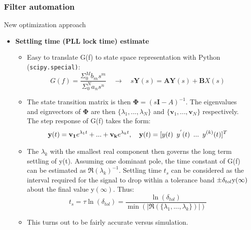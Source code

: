 \documentclass[t, screen, aspectratio=43]{beamer}
\begin{document}
\begin{frame}
	\frametitle{Filter automation}
	\begin{block}{New optimization approach}
		\begin{itemize}
			\scriptsize
			\item \textbf{Settling time (PLL lock time) estimate}
			\begin{itemize}
				\tiny
				\item Easy to translate G(f) to state space representation with Python (\texttt{scipy.special)}:
				\tiny
				\begin{equation}
				G(f) = \frac{\Sigma_0^M b_ms^m}{\Sigma_0^N a_ns^n} \hspace{1em} \rightarrow \hspace{1em} s\mathbf{Y}(s) = \mathbf{AY}(s) +\mathbf{B}X(s)
				\end{equation}
				\item The state transition matrix is then $\boldsymbol{\Phi} = (s\mathbf{I}-A)^{-1}$. The eigenvalues and eignvectors of $\boldsymbol{\Phi}$ are then $\{\lambda_1, ... , \lambda_{N}\}$ and $\{\mathbf{v}_1, ... , \mathbf{v}_N\}$ respectively. The step response of G(f) takes the form:
				\begin{equation}
				\mathbf{y}(t) = \mathbf{v_1}e^{\lambda_1t} + ... + \mathbf{v_k}e^{\lambda_kt}, \hspace{1em} \mathbf{y}(t) = [ y(t) \hspace{0.5em}y^{'}(t)\hspace{0.5em} ...\hspace{0.5em} y^{(k)}(t)]^T
				\end{equation}
				\item The $\lambda_k$ with the smallest real component then governs the long term settling of y(t). Assuming one dominant pole, the time constant of G(f) can be estimated as $\Re(\lambda_k)^{-1}$. Settling time $t_s$ can be considered as the interval required for the signal to drop within a tolerance band $\pm \delta_{tol} \textnormal{y}(\infty)$ about the final value y$(\infty)$. Thus:
				\begin{equation}
				t_s = \tau\ln(\delta_{tol}) = \frac{\ln(\delta_{tol})}{\min(|\Re(\{\lambda_1, ... , \lambda_k\})|)}
				\end{equation}
				\item This turns out to be fairly accurate versus simulation.
			\end{itemize}
		\end{itemize}    
	\end{block}
\end{frame}
\end{document}
